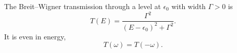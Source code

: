 \documentclass{article}
\begin{document}
The Breit--Wigner transmission through a level at $\epsilon_0$ with width $\Gamma>0$ is
\begin{equation}
T(E) = \frac{\Gamma^2}{(E-\epsilon_0)^2+\Gamma^2} .
\label{eq:bw}
\end{equation}
It is even in energy,
\begin{equation}
T(\omega) = T(-\omega) .
\label{eq:even}
\end{equation}
\end{document}

